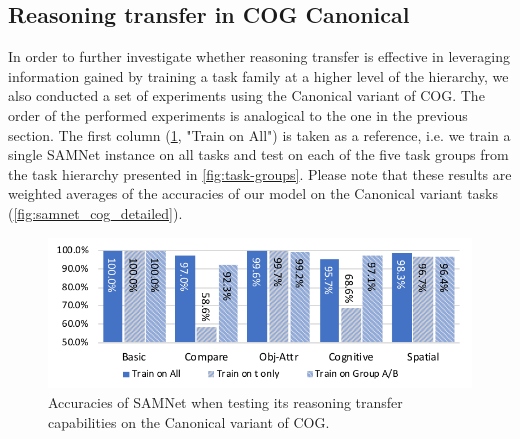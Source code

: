 



\subsection{Reasoning transfer in COG Canonical}
\label{sec:reasoning-transfer-cog}
In order to further investigate whether reasoning transfer is effective in leveraging information gained by training a task family at a higher level of the hierarchy, we also conducted a set of experiments using the Canonical variant of COG.
The order of the performed experiments is analogical to the one in the previous section.
The first column (\cref{fig:cog_reasoning_transfer}, "Train on All") is taken as a reference, i.e.
we train a single SAMNet instance on all tasks and test on each of the five task groups from the task hierarchy presented in \cref{fig:task-groups}.
Please note that these results are weighted averages of the accuracies of our model on the Canonical variant tasks (\cref{fig:samnet_cog_detailed}).

\begin{figure}[htbp]
	\centering
	\includegraphics[width=\columnwidth]{../img/plots/cog_reasoning_transfer.pdf}
	\caption{Accuracies of SAMNet when testing its reasoning transfer capabilities on the Canonical variant of COG.}
	\label{fig:cog_reasoning_transfer}
\end{figure}

